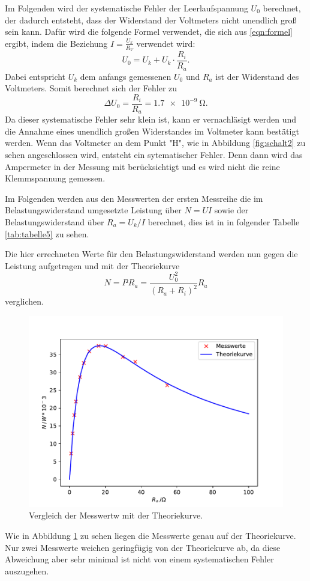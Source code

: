 \noindent Im Folgenden wird der systematische Fehler der Leerlaufspannung $U_{0}$ berechnet,
der dadurch entsteht, dass der Widerstand der Voltmeters nicht unendlich groß sein kann.
Dafür wird die folgende Formel verwendet, die sich aus \ref{eqn:formel} ergibt, indem
die Beziehung $I=\frac{U_{k}}{R_{V}}$ verwendet wird:
\begin{equation}
  U_{0}=U_{k}+U_{k}\cdot \frac{R_{i}}{R_{a}}.
\end{equation}
Dabei entspricht $U_{k}$ dem anfangs gemessenen $U_{0}$ und $R_{a}$ ist der
Widerstand des Voltmeters. Somit berechnet sich der Fehler zu
\begin{equation}
  \Delta U_{0} = \frac{R_{i}}{R_{a}} = \SI{1.7e-9}{\ohm}.
\end{equation}
\noindent Da dieser systematische Fehler sehr klein ist, kann er vernachläsigt werden und die
Annahme eines unendlich großen Widerstandes im Voltmeter kann bestätigt werden.
Wenn das Voltmeter an dem Punkt "H", wie in Abbildung \ref{fig:schalt2}
zu sehen angeschlossen wird, entsteht ein sytematischer Fehler. Denn dann wird
das Ampermeter in der Messung mit berücksichtigt und es wird nicht die reine
Klemmspannung gemessen.

\noindent Im Folgenden werden aus den Messwerten der ersten Messreihe die
im Belastungswiderstand umgesetzte Leistung über $N=UI$ sowie der Belastungswiderstand
über $R_{a}=U_{k}/I$ berechnet, dies ist in in folgender Tabelle \ref{tab:tabelle5} zu sehen.

\noindent Die hier errechneten Werte für den Belastungswiderstand werden nun gegen
die Leistung aufgetragen und mit der Theoriekurve
\begin{equation*}
  N=I²R_{a}=\frac{U_{0}^2}{(R_{a}+R_{i})^2}R_{a}
\end{equation*}
verglichen.

\begin{figure}[H]
  \centering
  \includegraphics{plot5.pdf}
  \caption{Vergleich der Messwertw mit der Theoriekurve.}
  \label{fig:plot5}
\end{figure}
\noindent Wie in Abbildung \ref{fig:plot5} zu sehen liegen die Messwerte genau auf der
Theoriekurve. Nur zwei Messwerte weichen geringfügig von der Theoriekurve ab,
da diese Abweichung aber sehr minimal ist nicht von einem
systematischen Fehler auszugehen.

\label{sec:Auswertung}

